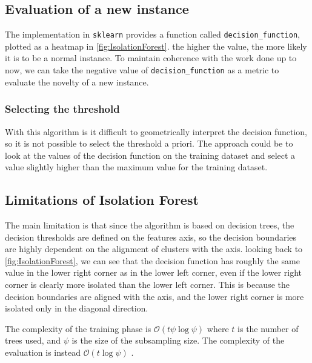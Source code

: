 \subsection{Evaluation of a new instance}
\label{sec:iforest_eval}
The implementation in \texttt{sklearn} provides a function called \texttt{decision\_function}, plotted as a heatmap in \autoref{fig:IsolationForest}. the higher the value, the more likely it is to be a normal instance.
To maintain coherence with the work done up to now, we can take the negative value of \texttt{decision\_function} as a metric to evaluate the novelty of a new instance.

\subsubsection{Selecting the threshold}
\label{sec:iforest_threshold}
With this algorithm is it difficult to geometrically interpret the decision function, so it is not possible to select the threshold a priori. The approach could be to look at the values of the decision function on the training dataset and select a value slightly higher than the maximum value for the training dataset.

\subsection{Limitations of Isolation Forest}
The main limitation is that since the algorithm is based on decision trees, the decision thresholds are defined on the features axis, so the decision boundaries are highly dependent on the alignment of clusters with the axis. looking back to \autoref{fig:IsolationForest}, we can see that the decision function has roughly the same value in the lower right corner as in the lower left corner, even if the lower right corner is clearly more isolated than the lower left corner. This is because the decision boundaries are aligned with the axis, and the lower right corner is more isolated only in the diagonal direction.

The complexity of the training phase is $\mathcal{O}(t\psi\log\psi)$ where $t$ is the number of trees used, and $\psi$ is the size of the subsampling size. The complexity of the evaluation is instead $\mathcal{O}(t\log\psi)$ \cite{iforest}.